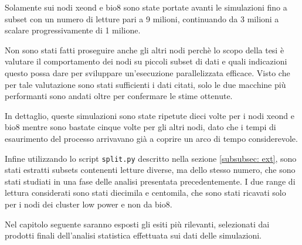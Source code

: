 Solamente sui nodi xeond e bio8 sono state portate avanti le simulazioni fino a subset con un numero di letture pari a 9 milioni, continuando da 3 milioni a scalare progressivamente di 1 milione.

Non sono stati fatti proseguire anche gli altri nodi perchè lo scopo della tesi è valutare il comportamento dei nodi su piccoli subset di dati e quali indicazioni questo possa dare per sviluppare un'esecuzione parallelizzata efficace.
Visto che per tale valutazione sono stati sufficienti i dati citati, solo le due macchine più performanti sono andati oltre per confermare le stime ottenute.

In dettaglio, queste simulazioni sono state ripetute dieci volte per i nodi xeond e bio8 mentre sono bastate cinque volte per gli altri nodi, dato che i tempi di esaurimento del processo arrivavano già a coprire un arco di tempo considerevole.

Infine utilizzando lo script \verb!split.py! descritto nella sezione \ref{subsubsec: ext}, sono stati estratti subsets contenenti letture diverse, ma dello stesso numero, che sono stati studiati in una fase delle analisi presentata precedentemente.
I due range di lettura considerati sono stati diecimila e centomila, che sono stati ricavati solo per i nodi dei cluster low power e non da bio8.

Nel capitolo seguente saranno esposti gli esiti più rilevanti, selezionati dai prodotti finali dell'analisi statistica effettuata sui dati delle simulazioni.  

